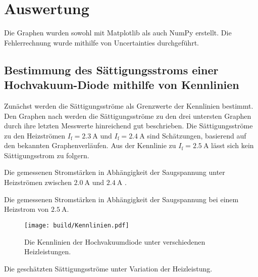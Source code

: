 \section{Auswertung}
\label{sec:Auswertung}

Die Graphen wurden sowohl mit Matplotlib \cite{matplotlib} als auch NumPy \cite{numpy} erstellt. Die
 Fehlerrechnung wurde mithilfe von Uncertainties \cite{uncertainties} durchgeführt.


 \subsection{Bestimmung des Sättigungsstroms einer Hochvakuum-Diode mithilfe von Kennlinien}
Zunächst werden die Sättigungsströme als Grenzwerte der Kennlinien bestimmt. Den Graphen nach werden die
Sättigungsströme zu den drei untersten Graphen durch ihre letzten Messwerte hinreichend
gut beschrieben. Die Sättigungsströme zu den Heizströmen $I_\text{f} = \SI{2.3}{\ampere}$ und $I_\text{f} = \SI{2.4}{\ampere}$
sind Schätzungen, basierend auf den bekannten Graphenverläufen. Aus der Kennlinie
zu $I_\text{f} = \SI{2.5}{\ampere}$ lässt sich kein Sättigungsstrom zu folgern.

 \begin{table}
 	\centering
 	\caption{Die gemessenen Stromstärken in Abhängigkeit der Saugspannung unter Heizströmen zwischen $\SI{2,0}{\ampere}$ und $\SI{2,4}{\ampere}$ .}
 	
 \end{table}

 \begin{table}
  \centering
  \caption{Die gemessenen Stromstärken in Abhängigkeit der Saugspannung bei einem Heizstrom von $\SI{2,5}{\ampere}$.}
  
  
 \end{table}

 \begin{figure}
 	\centering
 	\caption{Die Kennlinien der Hochvakuumdiode unter verschiedenen Heizleistungen.}
 	\texttt{[image: build/Kennlinien.pdf]}
 	\label{fig:Graph}
 \end{figure}

 \begin{table}
  \centering
  \caption{Die geschätzten Sättigungsströme unter Variation der Heizleistung.}
  
 \end{table}




